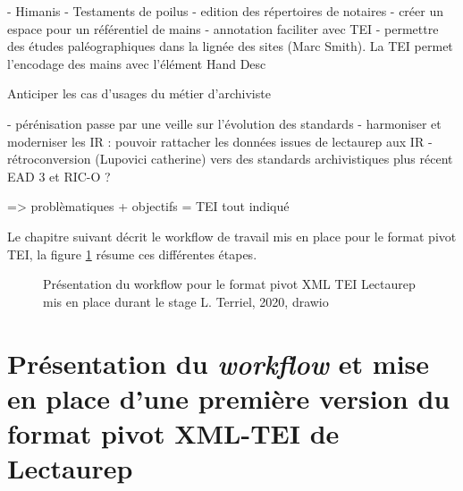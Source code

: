 - Himanis
- Testaments de poilus
- edition des répertoires de notaires
- créer un espace pour un référentiel de mains
- annotation faciliter avec TEI
- permettre des études paléographiques dans la lignée des sites (Marc Smith). La TEI permet l'encodage des mains avec l'élément Hand Desc

Anticiper les cas d'usages du métier d'archiviste




- pérénisation passe par une veille sur l'évolution des standards 
- harmoniser et moderniser les IR : pouvoir rattacher les données issues de lectaurep aux IR
- rétroconversion (Lupovici catherine) vers des standards archivistiques plus récent EAD 3 et RIC-O ? 

=> problèmatiques + objectifs = TEI tout indiqué 

Le chapitre suivant décrit le workflow de travail mis en place pour le format pivot TEI, la figure \ref{fig:workflow_tei_pivot_lectaurep} résume ces différentes étapes.

\begin{figure}[h]
    \centering
    \centerline{}
    \caption{Présentation du workflow pour le format pivot XML TEI Lectaurep mis en place durant le stage  \textcopyright L. Terriel, 2020, drawio}
    \label{fig:workflow_tei_pivot_lectaurep}
\end{figure}

\chapter{Présentation du \textit{workflow} et mise en place d'une première version du format pivot XML-TEI de Lectaurep}

